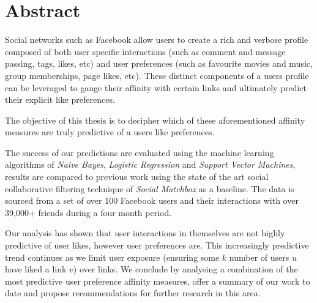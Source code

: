 
\chapter*{Abstract}
\label{cha:abstract}

Social networks such as Facebook allow users to create a rich and verbose profile composed of both user specific interactions (such as 
comment and message passing, tags, likes, etc) and user preferences (such as favourite movies and music, group memberships, page likes, etc). 
These distinct components of a users profile can be leveraged to gauge their affinity with certain links and ultimately predict their
explicit like preferences.

The objective of this thesis is to decipher which of these aforementioned affinity measures are truly predictive of a users like preferences.

The success of our predictions are evaluated using the machine learning algorithms of  
\emph{Naive Bayes}, \emph{Logistic Regression} and \emph{Support Vector Machines}, results are compared to previous 
work using the state of the art social collaborative filtering technique of \emph{Social Matchbox} as a baseline. 
The data is sourced from a set of over 100 Facebook users and their interactions with over 39,000+ friends during a four month period.

Our analysis has shown that user interactions in themselves are not highly predictive of user likes, however user preferences are. 
This increasingly predictive trend continues as we limit user exposure (ensuring some $k$ number of users $u$ have liked a link $v$) over links. 
We conclude by analysing a combination of the most predictive user preference affinity measures, offer a summary of our work to date and propose 
recommendations for further research in this area.


